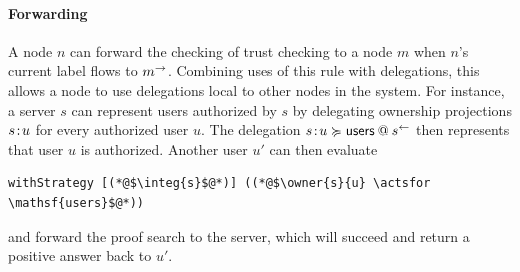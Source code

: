 \paragraph{Forwarding}
A node $n$ can forward the checking of trust checking to a node $m$ when $n$'s current label flows to $\conf{m}$. Combining uses of this rule with delegations, this allows a node to use delegations local to other nodes in the system. For instance, a server $s$ can represent users authorized by $s$ by delegating ownership projections $\owner{s}{u}$ for every authorized user $u$. The delegation $\lb{\integ{s}}{\owner{s}{u} \actsfor \mathsf{users}}$ then represents that user $u$ is authorized. Another user $u'$ can then evaluate
\begin{lstlisting}
withStrategy [(*@$\integ{s}$@*)] ((*@$\owner{s}{u} \actsfor \mathsf{users}$@*))
\end{lstlisting}
and forward the proof search to the server, which will succeed and return a positive answer back to $u'$.
